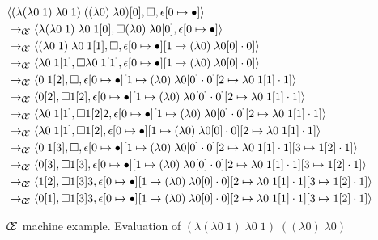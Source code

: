 \begin{sidewaysfigure}
\begin{align*}
&\langle (\lambda(\lambda0\;1)\;\lambda0\;1)\;((\lambda0)\;\lambda0)[0],\square,\epsilon[0\mapsto\bullet]\rangle\\
&\rightarrow_{\mathcal{\mathcal{C} \mskip -4mu \mathcal{E}}}\langle \lambda(\lambda0\;1)\;\lambda0\;1[0],\square (\lambda0)\;\lambda0[0],\epsilon[0\mapsto\bullet]\rangle\\ 
&\rightarrow_{\mathcal{\mathcal{C} \mskip -4mu \mathcal{E}}}\langle (\lambda0\;1)\;\lambda0\;1[1],\square,\epsilon[0\mapsto\bullet][1\mapsto(\lambda0)\;\lambda0[0]\cdot0]\rangle\\ 
&\rightarrow_{\mathcal{\mathcal{C} \mskip -4mu \mathcal{E}}}\langle \lambda0\;1[1],\square \lambda0\;1[1],\epsilon[0\mapsto\bullet][1\mapsto(\lambda0)\;\lambda0[0]\cdot0]\rangle\\ 
&\rightarrow_{\mathcal{\mathcal{C} \mskip -4mu \mathcal{E}}}\langle 0\;1[2],\square,\epsilon[0\mapsto\bullet][1\mapsto(\lambda0)\;\lambda0[0]\cdot0][2\mapsto\lambda0\;1[1]\cdot1]\rangle\\ 
&\rightarrow_{\mathcal{\mathcal{C} \mskip -4mu \mathcal{E}}}\langle 0[2],\square 1[2],\epsilon[0\mapsto\bullet][1\mapsto(\lambda0)\;\lambda0[0]\cdot0][2\mapsto\lambda0\;1[1]\cdot1]\rangle\\ 
&\rightarrow_{\mathcal{\mathcal{C} \mskip -4mu \mathcal{E}}}\langle \lambda0\;1[1],\square 1[2] 2,\epsilon[0\mapsto\bullet][1\mapsto(\lambda0)\;\lambda0[0]\cdot0][2\mapsto\lambda0\;1[1]\cdot1]\rangle\\ 
&\rightarrow_{\mathcal{\mathcal{C} \mskip -4mu \mathcal{E}}}\langle \lambda0\;1[1],\square 1[2],\epsilon[0\mapsto\bullet][1\mapsto(\lambda0)\;\lambda0[0]\cdot0][2\mapsto\lambda0\;1[1]\cdot1]\rangle\\ 
&\rightarrow_{\mathcal{\mathcal{C} \mskip -4mu \mathcal{E}}}\langle 0\;1[3],\square,\epsilon[0\mapsto\bullet][1\mapsto(\lambda0)\;\lambda0[0]\cdot0][2\mapsto\lambda0\;1[1]\cdot1][3\mapsto1[2]\cdot1]\rangle\\ 
&\rightarrow_{\mathcal{\mathcal{C} \mskip -4mu \mathcal{E}}}\langle 0[3],\square 1[3],\epsilon[0\mapsto\bullet][1\mapsto(\lambda0)\;\lambda0[0]\cdot0][2\mapsto\lambda0\;1[1]\cdot1][3\mapsto1[2]\cdot1]\rangle\\ 
&\rightarrow_{\mathcal{\mathcal{C} \mskip -4mu \mathcal{E}}}\langle 1[2],\square 1[3] 3,\epsilon[0\mapsto\bullet][1\mapsto(\lambda0)\;\lambda0[0]\cdot0][2\mapsto\lambda0\;1[1]\cdot1][3\mapsto1[2]\cdot1]\rangle\\ 
&\rightarrow_{\mathcal{\mathcal{C} \mskip -4mu \mathcal{E}}}\langle 0[1],\square 1[3] 3,\epsilon[0\mapsto\bullet][1\mapsto(\lambda0)\;\lambda0[0]\cdot0][2\mapsto\lambda0\;1[1]\cdot1][3\mapsto1[2]\cdot1]\rangle\\ 
\end{align*}
\caption{$\mathcal{\mathcal{C} \mskip -4mu \mathcal{E}}$ machine example.
Evaluation of $(\lambda(\lambda0\;1)\;\lambda0\;1)\;((\lambda0)\;\lambda0)$}
\label{fig:state}
\end{sidewaysfigure}
